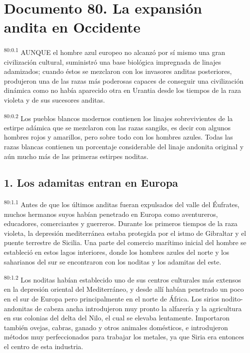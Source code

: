 \chapter{Documento 80. La expansión andita en Occidente}
\par
\textsuperscript{80:0.1} AUNQUE el hombre azul europeo no alcanzó por sí mismo una gran civilización cultural, suministró una base biológica impregnada de linajes adamizados; cuando éstos se mezclaron con los invasores anditas posteriores, produjeron una de las razas más poderosas capaces de conseguir una civilización dinámica como no había aparecido otra en Urantia desde los tiempos de la raza violeta y de sus sucesores anditas.

\par
\textsuperscript{80:0.2} Los pueblos blancos modernos contienen los linajes sobrevivientes de la estirpe adámica que se mezclaron con las razas sangiks, es decir con algunos hombres rojos y amarillos, pero sobre todo con los hombres azules. Todas las razas blancas contienen un porcentaje considerable del linaje andonita original y aún mucho más de las primeras estirpes noditas.

\section*{1. Los adamitas entran en Europa}
\par
\textsuperscript{80:1.1} Antes de que los últimos anditas fueran expulsados del valle del
Éufrates, muchos hermanos suyos habían penetrado en Europa como aventureros, educadores, comerciantes y guerreros. Durante los primeros tiempos de la raza violeta, la depresión mediterránea estaba protegida por el istmo de Gibraltar y el puente terrestre de Sicilia. Una parte del comercio marítimo inicial del hombre se estableció en estos lagos interiores, donde los hombres azules del norte y los saharianos del sur se encontraron con los noditas y los adamitas del este.

\par
\textsuperscript{80:1.2} Los noditas habían establecido uno de sus centros culturales más extensos en la depresión oriental del Mediterráneo, y desde allí habían penetrado un poco en el sur de Europa pero principalmente en el norte de África. Los sirios nodito-andonitas de cabeza ancha introdujeron muy pronto la alfarería y la agricultura en sus colonias del delta del Nilo, el cual se elevaba lentamente. Importaron también ovejas, cabras, ganado y otros animales domésticos, e introdujeron métodos muy perfeccionados para trabajar los metales, ya que Siria era entonces el centro de esta industria.


